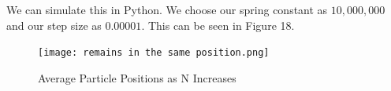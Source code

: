 \documentclass[12pt]{article}
\begin{document}
We can simulate this in Python. We choose our spring constant as $10,000,000$ and our step size as $0.00001$. This can be seen in Figure 18.

\begin{figure}[h!]
  \texttt{[image: remains in the same position.png]}
  \caption{Average Particle Positions as N Increases}
  \label{fig:mc_randomness}
\end{figure}
\end{document}
